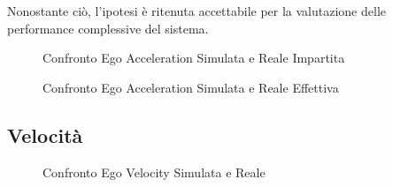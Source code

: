 Nonostante ciò, l'ipotesi è ritenuta accettabile per la valutazione delle performance complessive del sistema.
\begin{figure}[H]
    \centering
    \caption{Confronto Ego Acceleration Simulata e Reale Impartita}
    \label{fig:acceleration_impartita}
\end{figure}
\begin{figure}[H]
    \centering
    \caption{Confronto Ego Acceleration Simulata e Reale Effettiva}
    \label{fig:acceleration_effettiva}
\end{figure}
\subsection{Velocità}
\begin{figure}[H]
    \centering
    \caption{Confronto Ego Velocity Simulata e Reale}
    \label{fig:ego_velocity_reale}
\end{figure}
